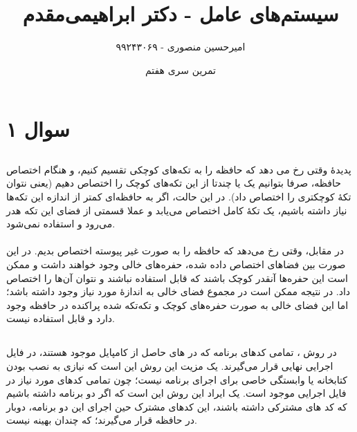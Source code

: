 \documentclass{article}
\title{سیستم‌های عامل - دکتر ابراهیمی‌مقدم}
\author{امیرحسین منصوری - ۹۹۲۴۳۰۶۹}
\date{تمرین سری هفتم}
\begin{document}
	\maketitle

	\section*{سوال ۱}
	\subsection*{}
	\paragraph*{}
	پدیدهٔ
	وقتی رخ می دهد که حافظه را به تکه‌های کوچکی تقسیم کنیم، و هنگام اختصاص حافظه، صرفا بتوانیم یک یا چندتا از این تکه‌های کوچک را اختصاص دهیم (یعنی نتوان تکهٔ کوچکتری را اختصاص داد). در این حالت، اگر به حافظه‌ای کمتر از اندازه این تکه‌ها نیاز داشته باشیم، یک تکهٔ کامل اختصاص می‌یابد و عملا قسمتی از فضای این تکه هدر می‌رود و استفاده نمی‌شود.

	\paragraph*{}
	در مقابل،
	وقتی رخ می‌دهد که حافظه را به صورت غیر پیوسته اختصاص بدیم. در این صورت بین فضا‌های اختصاص داده شده، حفره‌های خالی وجود خواهند داشت و ممکن است این حفره‌ها آنقدر کوچک باشند که قابل استفاده نباشند و نتوان آن‌ها را اختصاص داد. در نتیجه ممکن است در مجموع فضای خالی به اندازهٔ مورد نیاز وجود داشته باشد؛ اما این فضای خالی به صورت حفره‌های کوچک و تکه‌تکه شده پراکنده در حافظه وجود دارد و قابل استفاده نیست.

	\subsection*{}
	\paragraph*{}
	در روش
	،
	تمامی کدهای برنامه که در
	های
	حاصل از کامپایل موجود هستند، در فایل اجرایی نهایی قرار می‌گیرند. یک مزیت این روش این است که نیازی به نصب بودن کتابخانه یا وابستگی خاصی برای اجرای برنامه نیست؛ چون تمامی کدهای مورد نیاز در فایل اجرایی موجود است. یک ایراد این روش این است که اگر دو برنامه داشته باشیم که کد های مشترکی داشته باشند، این کدهای مشترک حین اجرای این دو برنامه، دوبار در حافظه قرار می‌گیرند؛ که چندان بهینه نیست.
\end{document}
